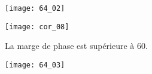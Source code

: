 \else
\fi

\ifprof
\else
\begin{marginfigure}
\texttt{[image: 64\_02]}
\end{marginfigure}
\fi

\ifprof

\begin{marginfigure}
\texttt{[image: cor\_08]}
\end{marginfigure}

La marge de phase est supérieure à 60\degres.

\else
\fi


\ifprof
\else
\begin{marginfigure}
\texttt{[image: 64\_03]}
\end{marginfigure}
\fi


 

\ifprof
\else
%



\fi